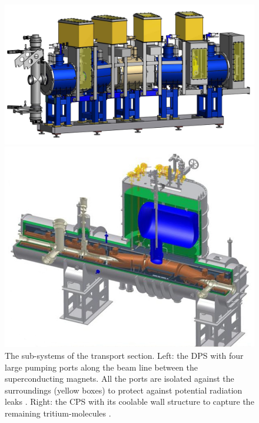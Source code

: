       \begin{figure}
		\begin{minipage}{0.49\textwidth}
				\includegraphics[width = 1.0\textwidth]{graphics/katrinExperiment/DPS.jpg}
		\end{minipage}
		\begin{minipage}{0.49\textwidth}
			\includegraphics[width = 1.0\textwidth]{graphics/katrinExperiment/CPS.jpg}
		\end{minipage}
		\caption[DPS and CPS]{The sub-systems of the transport section. Left: the DPS with four large pumping ports along the beam line between the superconducting magnets. All the ports are isolated against the surroundings (yellow boxes) to protect against potential radiation leaks \cite{DPS}. Right: the CPS with its coolable wall structure to capture the remaining tritium-molecules \cite{CPS}.}
      \end{figure}
      
